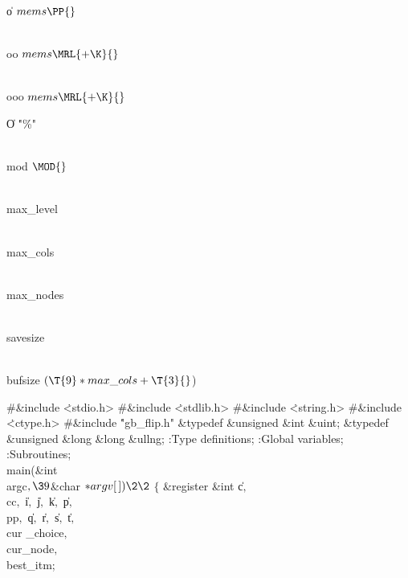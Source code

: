 \Y\B\4\D\|o\5
$\\{mems}\PP{}$\par
\B\4\D\\{oo}\5
$\\{mems}\MRL{+{\K}}{}$\par
\B\4\D\\{ooo}\5
$\\{mems}\MRL{+{\K}}{}$\par
\B\4\D\|O\5
\.{"\%"}\par
\B\4\D\\{mod}\5
$\MOD{}$\par
\B\4\D\\{max\_level}\5
\par
\B\4\D\\{max\_cols}\5
\par
\B\4\D\\{max\_nodes}\5
\par
\B\4\D\\{savesize}\5
\par
\B\4\D\\{bufsize}\5
$(\T{9}*\\{max\_cols}+\T{3}{}$)%
\par
\Y\B\8\#\&{include} \.{<stdio.h>}\6
\8\#\&{include} \.{<stdlib.h>}\6
\8\#\&{include} \.{<string.h>}\6
\8\#\&{include} \.{<ctype.h>}\6
\8\#\&{include} \.{"gb\_flip.h"}\6
\&{typedef} \&{unsigned} \&{int} \&{uint};\6
\&{typedef} \&{unsigned} \&{long} \&{long} \&{ullng};\7
:Type definitions\X;\6
:Global variables\X;\6
:Subroutines\X;\7
\1\1\\{main}(\&{int} \\{argc}${},\39{}$\&{char} ${}{*}\\{argv}[\,])\2\2{}$\6
${}\{{}$\1\6
\&{register} \&{int} \|c${},{}$ \\{cc}${},{}$ \|i${},{}$ \|j${},{}$ \|k${},{}$ %
\|p${},{}$ \\{pp}${},{}$ \|q${},{}$ \|r${},{}$ \|s${},{}$ \|t${},{}$ \\{cur%
\_choice}${},{}$ \\{cur\_node}${},{}$ \\{best\_itm};\7
